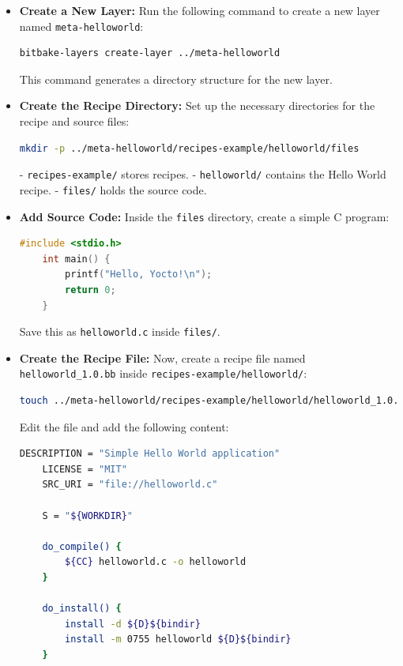\documentclass{article}
\begin{document}
\begin{itemize}
    \item \textbf{Create a New Layer:}  
    Run the following command to create a new layer named \texttt{meta-helloworld}:
    \begin{lstlisting}[language=bash]
    bitbake-layers create-layer ../meta-helloworld
    \end{lstlisting}
    This command generates a directory structure for the new layer.

    \item \textbf{Create the Recipe Directory:}  
    Set up the necessary directories for the recipe and source files:
    \begin{lstlisting}[language=bash]
    mkdir -p ../meta-helloworld/recipes-example/helloworld/files
    \end{lstlisting}
    - \texttt{recipes-example/} stores recipes.
    - \texttt{helloworld/} contains the Hello World recipe.
    - \texttt{files/} holds the source code.

    \item \textbf{Add Source Code:}  
    Inside the \texttt{files} directory, create a simple C program:
    \begin{lstlisting}[language=c]
    #include <stdio.h>
    int main() {
        printf("Hello, Yocto!\n");
        return 0;
    }
    \end{lstlisting}
    Save this as \texttt{helloworld.c} inside \texttt{files/}.

    \item \textbf{Create the Recipe File:}  
    Now, create a recipe file named \texttt{helloworld\_1.0.bb} inside \texttt{recipes-example/helloworld/}:
    \begin{lstlisting}[language=bash]
    touch ../meta-helloworld/recipes-example/helloworld/helloworld_1.0.bb
    \end{lstlisting}
    Edit the file and add the following content:
    \begin{lstlisting}[language=sh]
    DESCRIPTION = "Simple Hello World application"
    LICENSE = "MIT"
    SRC_URI = "file://helloworld.c"

    S = "${WORKDIR}"

    do_compile() {
        ${CC} helloworld.c -o helloworld
    }

    do_install() {
        install -d ${D}${bindir}
        install -m 0755 helloworld ${D}${bindir}
    }
    \end{lstlisting}


\end{itemize}
\end{document}

